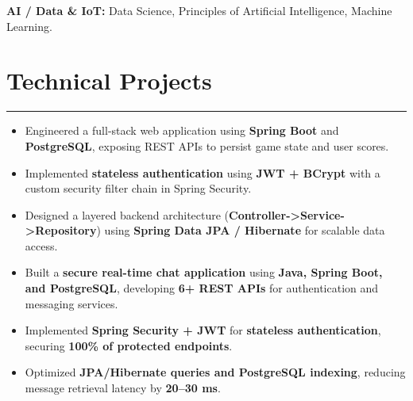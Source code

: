 \documentclass[]{resume-openfont}
\begin{document}
\vspace{1mm}
\textbf{AI / Data \& IoT:} Data Science, Principles of Artificial Intelligence, Machine Learning.
\sectionsep

\section{Technical Projects}
\vspace{0mm}
\hrule
\vspace{3mm}
\vspace{-2mm}
\begin{itemize}\itemsep -2pt
\item Engineered a full-stack web application using \textbf{Spring Boot} and \textbf{PostgreSQL}, exposing REST APIs to persist game state and user scores.
\item Implemented \textbf{stateless authentication} using \textbf{JWT + BCrypt} with a custom security filter chain in Spring Security.
\item Designed a layered backend architecture (\textbf{Controller->Service->Repository}) using \textbf{Spring Data JPA / Hibernate} for scalable data access.
\end{itemize}

\vspace{-2mm}
\begin{itemize}\itemsep -2pt
\item Built a \textbf{secure real-time chat application} using \textbf{Java, Spring Boot, and PostgreSQL}, developing \textbf{6+ REST APIs} for authentication and messaging services.
\item Implemented \textbf{Spring Security + JWT} for \textbf{stateless authentication}, securing \textbf{100\% of protected endpoints}.
\item Optimized \textbf{JPA/Hibernate queries and PostgreSQL indexing}, reducing message retrieval latency by \textbf{20--30 ms}.
\end{itemize}
\end{document}
